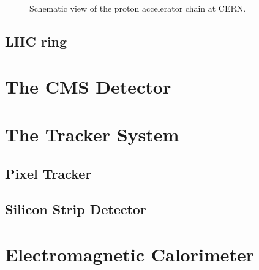\begin{figure}[ht]
\begin{center}
\caption{Schematic view of the proton accelerator chain at CERN.}\label{chp2:LHCaccelerationchain}
\end{center}
\end{figure}


\subsection{LHC ring}
\label{subsec:LHCring}



\section{The CMS Detector}
\label{sec:CMS}

\section{The Tracker System}
\label{sec:Tracker}

\subsection{Pixel Tracker}
\label{subsec:Pixel}

\subsection{Silicon Strip Detector}
\label{subsec:Strip}

\section{Electromagnetic Calorimeter}
\label{sec:ECal}

